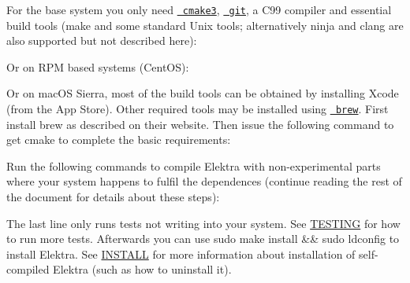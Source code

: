 For the base system you only need \href{https://cmake.org/cmake/help/v3.0/}{\texttt{ cmake3}}, \href{https://git-scm.com/}{\texttt{ git}}, a C99 compiler and essential build tools (make and some standard Unix tools; alternatively ninja and clang are also supported but not described here)\+:


\begin{DoxyCode}{0}
\end{DoxyCode}


Or on R\+PM based systems (Cent\+OS)\+:


\begin{DoxyCode}{0}
\end{DoxyCode}


Or on mac\+OS Sierra, most of the build tools can be obtained by installing Xcode (from the App Store). Other required tools may be installed using \href{http://brew.sh/}{\texttt{ brew}}. First install brew as described on their website. Then issue the following command to get cmake to complete the basic requirements\+:


\begin{DoxyCode}{0}
\end{DoxyCode}


Run the following commands to compile Elektra with non-\/experimental parts where your system happens to fulfil the dependences (continue reading the rest of the document for details about these steps)\+:


\begin{DoxyCode}{0}
\end{DoxyCode}


The last line only runs tests not writing into your system. See \mbox{\hyperlink{doc_TESTING_md}{T\+E\+S\+T\+I\+NG}} for how to run more tests. Afterwards you can use {\ttfamily sudo make install \&\& sudo ldconfig} to install Elektra. See \mbox{\hyperlink{doc_INSTALL_md}{I\+N\+S\+T\+A\+LL}} for more information about installation of self-\/compiled Elektra (such as how to uninstall it).

